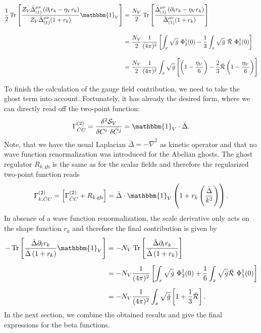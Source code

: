 \begin{align}
	\frac{1}{2}\tr{\frac{Z_V\bar{\Delta}^{\mu\nu}_{(1)}\left(\partial_t r_k - \eta_Vr_k\right)}{Z_V\bar{\Delta}^{\mu\nu}_{(1)}(1+r_k)}\mathbbm{1}_V} &= \frac{N_V}{2}\tr{\frac{\bar{\Delta}^{\mu\nu}_{(1)}\left(\partial_t r_k - \eta_Vr_k\right)}{\bar{\Delta}^{\mu\nu}_{(1)}(1+r_k)}}\nonumber \\[10pt]
	&= \frac{N_V}{2}\frac{1}{(4\pi)^2}\left[\int_x\sqrt{\bar{g}}\ \Phi_2^1(0) - \frac{1}{3}\int_x\sqrt{\bar{g}}\  \bar{\mathcal{R}} \  \Phi_1^1(0) \right] \\[10pt]
	&=  \frac{N_V}{2}\frac{1}{(4\pi)^2}\int_x\sqrt{\bar{g}}\left[\left(1-\frac{\eta_V}{6}\right)- \frac{2}{3}\bar{\mathcal{R}}\left(1-\frac{\eta_V}{6}\right)\right]\nonumber
\end{align}


To finish the calculation of the gauge field contribution, we need to take the ghost term into account. Fortunately, it has already the desired form, where we can directly read off the two-point function:
\begin{equation}
	\Gamma^{(2)}_{\bar{C}C} = \frac{\delta^2 \mathcal{S}_V}{\delta C^{i}\ \delta \bar{C}^{j}} = \mathbbm{1}_V\cdot\bar{\Delta}.
\end{equation} 
Note, that we have the usual Laplacian $\bar{\Delta} = -\bar{\nabla}^2$ as kinetic operator and that no wave function renormalization was introduced for the Abelian ghosts. The ghost regulator $R_{k, \mathrm{gh}}$ is the same as for the scalar fields and therefore the regularized two-point function reads
\begin{equation}
		\Gamma^{(2)}_{k, \bar{C}C} = \left[\Gamma^{(2)}_{ \bar{C}C}+ R_{k, \mathrm{gh}}\right]  = \bar{\Delta}\cdot\mathbbm{1}_V\left(1 + r_k\left(\frac{\bar{\Delta}}{k^2}\right)\right).
\end{equation} 
In absence of a wave function renormalization, the scale derivative only acts on the shape function $r_k$ and  therefore the final contribution is given by 
\begin{equation}
\begin{aligned}
	-\tr{\frac{\bar{\Delta}\partial_tr_k}{\bar{\Delta}\left(1+r_k\right)}\mathbbm{1}_V} &= -N_{V}\tr{\frac{\bar{\Delta}\partial_tr_k}{\bar{\Delta}\left(1+r_k\right)}} \\[5pt]
	&= -N_V\frac{1}{(4\pi)^2}\left[\int_x\sqrt{\bar{g}} \ \Phi_2^1(0) + \frac{1}{6}\int_x\sqrt{\bar{g}} \bar{\mathcal{R}} \ \Phi_1^1(0) \right] \\[5pt]
	&= -N_V\frac{1}{(4\pi)^2}\int_x\sqrt{\bar{g}}\left[1 + \frac{1}{3}\bar{\mathcal{R}}\right].	
\end{aligned}
\end{equation}  
In the next section, we combine the obtained results and  give the final expressions for the beta functions. 
